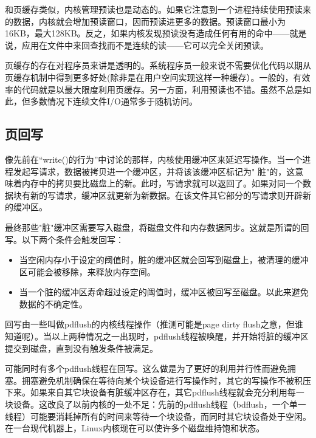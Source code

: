 和页缓存类似，内核管理预读也是动态的。如果它注意到一个进程持续使用预读来的数据，内核就会增加预读窗口，因而预读进更多的数据。预读窗口最小为16KB，最大128KB。反之，如果内核发现预读没有造成任何有用的命中——就是说，应用在文件中来回查找而不是连续的读——它可以完全关闭预读。

页缓存的存在对程序员来讲是透明的。系统程序员一般来说不需要优化代码以期从页缓存机制中得到更多好处(除非是在用户空间实现这样一种缓存）。一般的，有效率的代码就是以最大限度利用页缓存。另一方面，利用预读也不错。虽然不总是如此，但多数情况下连续文件I/O通常多于随机访问。 

\subsection{页回写}

像先前在“write()的行为”中讨论的那样，内核使用缓冲区来延迟写操作。当一个进程发起写请求，数据被拷贝进一个缓冲区，并将该该缓冲区标记为" 脏"的，这意味着内存中的拷贝要比磁盘上的新。此时，写请求就可以返回了。如果对同一个数据块有新的写请求，缓冲区就更新为新数据。在该文件其它部分的写请求则开辟新的缓冲区。 

最终那些"脏"缓冲区需要写入磁盘，将磁盘文件和内存数据同步。这就是所谓的回写。以下两个条件会触发回写： 

\begin{itemize}
\item \begin{flushleft}当空闲内存小于设定的阈值时，脏的缓冲区就会回写到磁盘上，被清理的缓冲区可能会被移除，来释放内存空间。\end{flushleft}
\item \begin{flushleft}当一个脏的缓冲区寿命超过设定的阈值时，缓冲区被回写至磁盘。以此来避免数据的不确定性。 \end{flushleft}
\end{itemize}

回写由一些叫做pdflush的内核线程操作（推测可能是page dirty flush之意，但谁知道呢）。当以上两种情况之一出现时，pdflush线程被唤醒，并开始将脏的缓冲区提交到磁盘，直到没有触发条件被满足。

可能同时有多个pdflush线程在回写。这么做是为了更好的利用并行性而避免拥塞。拥塞避免机制确保在等待向某个块设备进行写操作时，其它的写操作不被积压下来。如果来自其它块设备有脏缓冲区存在，其它pdflush线程就会充分利用每一块设备。这改良了以前内核的一处不足：先前的pdflush线程（bdflush，一个单一线程）可能要消耗掉所有的时间来等待一个块设备，而同时其它块设备处于空闲。在一台现代机器上，Linux内核现在可以使许多个磁盘维持饱和状态。

